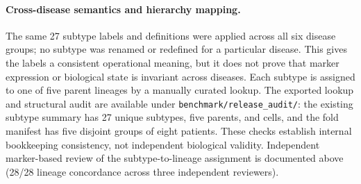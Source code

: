 

\paragraph{Cross-disease semantics and hierarchy mapping.}
The same 27 subtype labels and definitions were applied across all six disease
groups; no subtype was renamed or redefined for a particular disease. This gives
the labels a consistent operational meaning, but it does not prove that marker
expression or biological state is invariant across diseases. Each subtype is
assigned to one of five parent lineages by a manually curated lookup.
The exported lookup and structural audit are available under
\texttt{benchmark/release\_audit/}: the existing subtype summary has 27 unique
subtypes, five parents, and \numcells{} cells, and the fold manifest has five
disjoint groups of eight patients. These checks establish internal bookkeeping
consistency, not independent biological validity. Independent marker-based
review of the subtype-to-lineage assignment is documented above (28/28 lineage
concordance across three independent reviewers).

